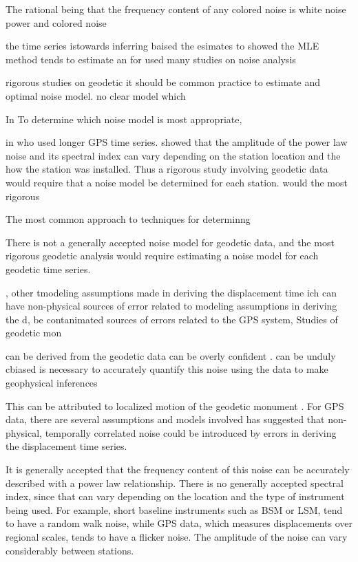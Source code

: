\documentclass[10pt,a4paper]{article}
\begin{document}
The rational being that the frequency content of any colored noise is    white noise power and colored noise 

the time series istowards inferring  baised  the esimates to  showed the MLE method tends to estimate an     
 for used many studies on noise analysis    


  rigorous studies on geodetic  it should be common practice to estimate and optimal noise model.  no clear model which 

In To determine which noise model is most appropriate,     

in  who used longer GPS time series.  \citet{Langbein2008} showed that the amplitude of the power law noise and its spectral index can vary depending on the station location and the how the station was installed. Thus a rigorous study involving geodetic data would require that a noise model be determined for each station.  would    the most rigorous      

The most common approach to techniques for determinng  


There is not a generally accepted noise model for geodetic data, and the most rigorous geodetic analysis would require estimating a noise model for each geodetic time series.  

    ,  other tmodeling assumptions made in deriving the displacement time ich can have non-physical sources of error related to modeling assumptions in deriving the d,  be contanimated sources of errors  related to the GPS system,            Studies of geodetic mon  


can be derived from the geodetic data can be overly confident \citep[e.g][]{Mao1999}.  can be unduly cbiased  is necessary to accurately quantify this noise using the data to make geophysical inferences 


This can be attributed to localized motion of the geodetic monument \citep[e.g.][]{Wyatt1982,Wyatt1989,Agnew1992,King2009}. For GPS data, there are several assumptions and models involved  \citet{Langbeing2008,Langbein2012} has suggested that non-physical, temporally correlated noise could be introduced by errors in deriving the displacement time series.  

It is generally accepted that the frequency content of this noise can be accurately described with a power law relationship.  There is no generally accepted spectral index, since that can vary depending on the location and the type of instrument being used.  For example, short baseline instruments such as BSM or LSM, tend to have a random walk noise, while GPS data, which measures displacements over regional scales, tends to have a flicker noise.  The amplitude of the noise can vary considerably between stations. 
\end{document}
